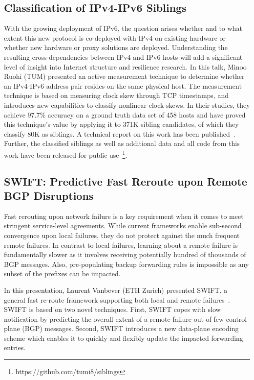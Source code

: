 \subsection{Classification of IPv4-IPv6 Siblings}

With the growing deployment of IPv6, the question arises whether and to what
extent this new protocol is co-deployed with IPv4 on existing hardware or
whether new hardware or proxy solutions are deployed. Understanding the
resulting cross-dependencies between IPv4 and IPv6 hosts will add a
significant level of insight into Internet structure and resilience research.
In this talk, Minoo Ruohi (TUM) presented an active measurement technique to
determine whether an IPv4-IPv6 address pair resides on the same physical host.
The measurement technique is based on measuring clock skew through TCP
timestamps, and introduces new capabilities to classify nonlinear clock skews.
In their studies, they achieve 97.7\% accuracy on a ground truth data set of
458 hosts and have proved this technique's value by applying it to 371K
sibling candidates, of which they classify 80K as siblings. A technical report
on this work has been published~\cite{Scheitle2016}. Further, the classified
siblings as well as additional data and all code from this work have been
released for public use~\footnote{https://github.com/tumi8/siblings}.


\subsection{SWIFT: Predictive Fast Reroute upon Remote BGP Disruptions}

Fast rerouting upon network failure is a key requirement when it comes to meet
stringent service-level agreements. While current frameworks enable sub-second
convergence upon local failures, they do not protect against the much frequent
remote failures. In contrast to local failures, learning about a remote
failure is fundamentally slower as it involves receiving potentially hundred
of thousands of BGP messages. Also, pre-populating backup forwarding rules is
impossible as any subset of the prefixes can be impacted.

In this presentation, Laurent Vanbever (ETH Zurich) presented SWIFT, a general
fast re-route framework supporting both local and remote failures~\cite{}.
SWIFT is based on two novel techniques. First, SWIFT copes with slow
notification by predicting the overall extent of a remote failure out of few
control-plane (BGP) messages. Second, SWIFT introduces a new data-plane
encoding scheme which enables it to quickly and flexibly update the impacted
forwarding entries.

